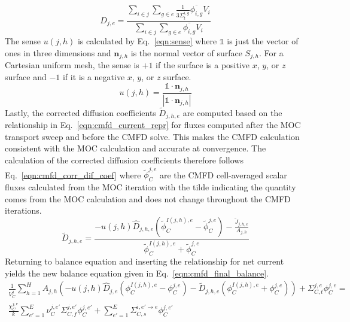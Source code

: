 \begin{equation}
	D_{j,e} = \frac{\sum_{i \in j} \sum_{g \in e} \frac{1}{3\Sigma_{t}^{i, g}} \overline{\phi_{i,g}} V_i}{\sum_{i \in j} \sum_{g \in e} \overline{\phi_{i,g}} V_i}
	\label{eqn:cmfd_diff_coef}
\end{equation}
The sense $u(j,h)$ is calculated by Eq.~\ref{eqn:sense} where $\mathbb{1}$ is just the vector of ones in three dimensions and $\mathbf{n}_{j,h}$ is the normal vector of surface $S_{j,h}$. For a Cartesian uniform mesh, the sense is $+1$ if the surface is a positive $x$, $y$, or $z$ surface and $-1$ if it is a negative $x$, $y$, or $z$ surface.
\begin{equation}
u(j,h) = \frac{\mathbb{1} \cdot \mathbf{n}_{j,h}}{|\mathbb{1} \cdot \mathbf{n}_{j,h}|}
\label{eqn:sense}
\end{equation}
Lastly, the corrected diffusion coefficients $\tilde{D}_{j,h,e}$ are computed based on the relationship in Eq.~\ref{eqn:cmfd_current_repr} for fluxes computed after the MOC transport sweep and before the CMFD solve. This makes the CMFD calculation consistent with the MOC calculation and accurate at convergence. The calculation of the corrected diffusion coefficients therefore follows Eq.~\ref{eqn:cmfd_corr_dif_coef} where $\tilde{\phi}_C^{j,e}$ are the CMFD cell-averaged scalar fluxes calculated from the MOC iteration with the tilde indicating the quantity comes from the MOC calculation and does not change throughout the CMFD iterations.
\begin{equation}
	\tilde{D}_{j,h,e} = \frac{-u(j, h) \hat{D}_{j,h,e} \left(\tilde{\phi}_C^{I(j,h),e} - \tilde{\phi}_C^{j,e}\right) - \frac{\tilde{J}_{j,h,e}}{A_{j,h}}}{\tilde{\phi}_C^{I(j,h),e} + \tilde{\phi}_C^{j,e}}
	\label{eqn:cmfd_corr_dif_coef}
\end{equation}
Returning to balance equation and inserting the relationship for net current yields the new balance equation given in Eq.~\ref{eqn:cmfd_final_balance}.
\begin{equation}
\begin{split}
	\frac{1}{V_C^j} \sum_{h=1}^H A_{j,h} \left( - u(j, h) \hat{D}_{j,e} \left(\phi_C^{I(j,h),e} - \phi_C^{j,e}\right) - \tilde{D}_{j,h,e} \left(\phi_C^{I(j,h),e} + \phi_C^{j,e}\right) \right) + \Sigma_{C,t}^{j,e} \phi_C^{j,e} = \\
	\frac{\chi_C^{j,e}}{k} \sum_{e'=1}^{E} \nu_C^{j, e'} \Sigma_{C,f}^{j,e'} \phi_C^{j,e'} + \sum_{e'=1}^E  \Sigma_{C,s}^{i, e' \rightarrow e} \phi_C^{j,e'}
\end{split}
\label{eqn:cmfd_final_balance}
\end{equation}

